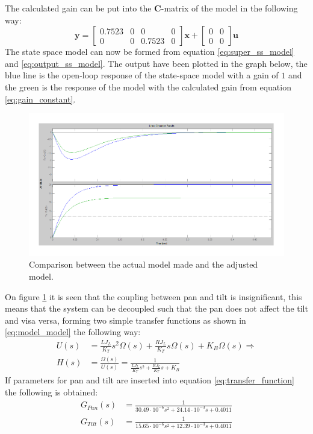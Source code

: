 The calculated gain can be put into the \textbf{C}-matrix of the model in the following way:
\begin{equation}
 \textbf{y} =
 \begin{bmatrix}
   0.7523 & 0 & 0 & 0\\
   0 & 0 & 0.7523 & 0
 \end{bmatrix}
 \textbf{x} +
 \begin{bmatrix}
   0 & 0\\
   0 & 0
 \end{bmatrix}
 \textbf{u}\label{eq:output_ss_model}
\end{equation}
The state space model can now be formed from equation \ref{eq:super_ss_model} and \ref{eq:output_ss_model}. The output have been plotted in the graph below, the blue line is the open-loop response of the state-space model with a gain of $1$ and the green is the response of the model with the calculated gain from equation \ref{eq:gain_constant}.
\begin{figure}[htb]
	\centering
	\includegraphics[width=\textwidth,trim=0 0 0 0]{graphics/ZoomOpenLoop.pdf} %
	\caption{Comparison between the actual model made and the adjusted model.}
	\label{fig:zoom_step}			%
\end{figure}
On figure \ref{fig:zoom_step} it is seen that the coupling between pan and tilt is insignificant, this means that the system can be decoupled such that the pan does not affect the tilt and visa versa, forming two simple transfer functions as shown in \ref{eq:model_model} the following way:
\begin{align}
	U(s) &= \frac{L J_L}{K_T} s^2 \Omega(s) + \frac{R J_L}{K_T} s \Omega(s) + K_B \Omega(s) \Rightarrow\\
	H(s) &= \frac{\Omega(s)}{U(s)} = \frac{1}{\frac{L J_L}{K_T} s^2 + \frac{R J_L}{K_T} s + K_B}\label{eq:transfer_function}
\end{align}
If parameters for pan and tilt are inserted into equation \ref{eq:transfer_function} the following is obtained:
\begin{align}
	G_{Pan}(s) &= \frac{1}{30.49 \cdot 10^{-6} s^2 + 24.14 \cdot 10^{-3} s + 0.4011}\label{eq:transfer_function_pan}\\
	G_{Tilt}(s) &= \frac{1}{15.65 \cdot 10^{-6} s^2 + 12.39 \cdot 10^{-3} s + 0.4011}\label{eq:transfer_function_tilt}
\end{align}

